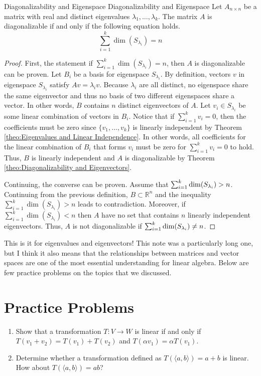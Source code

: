 \documentclass[../main.tex]{subfiles}
\begin{document}
\begin{theorem}{Diagonalizability and Eigenspace}
{Diagonalizability and Eigenspace}
Let $A_{n \times n}$ be a matrix with real and distinct eigenvalues
$\lambda_1, \ldots, \lambda_k$. The matrix $A$ is diagonalizable if
and only if the following equation holds.
\[
\sum_{i=1}^k \dim(S_{\lambda_i}) = n
\]
\end{theorem}
\begin{proof}
First, the statement if $\sum_{i=1}^k \dim(S_{\lambda_i}) = n$,
then $A$ is diagonalizable can be proven. Let $B_i$ be a basis
for eigenspace $S_{\lambda_i}$. By definition, vectors $v$ in
eigenspace $S_{\lambda_i}$ satisfy $Av = \lambda_i v$. Because
$\lambda_i$ are all distinct, no eigenspace share the same
eigenvector and thus no basis of two different eigenspaces
share a vector. In other words, $B$ contains $n$ distinct eigenvectors
of $A$. Let $v_i \in S_{\lambda_i}$ be some linear combination of
vectors in $B_i$. Notice that if $\sum_{i=1}^k v_i = 0$, then the
coefficients must be zero since $\{ v_1, \ldots, v_k \}$ is linearly
independent by Theorem \ref{theo:Eigenvalues and Linear Independence}.
In other words, all coefficients for the linear combination of $B_i$
that forms $v_i$ must be zero for $\sum_{i=1}^k v_i = 0$ to hold.
Thus, $B$ is linearly independent and $A$ is diagonalizable by
Theorem \ref{theo:Diagonalizability and Eigenvectors}.

Continuing, the converse can be proven. Assume that $\sum_{i=1}^k
\dim(S_{\lambda_i}) \linebreak > n$. Continuing from the previous
definition, $B \subset \mathbb{R}^n$ and the inequality $\sum_{i=1}^k
\dim(S_{\lambda_i}) > n$ leads to contradiction. Moreover, if
$\sum_{i=1}^k \dim(S_{\lambda_i}) < n$ then $A$ have no set that
contains $n$ linearly independent eigenvectors. Thus, $A$ is not
diagonalizable if $\sum_{i=1}^k \dim(S_{\lambda_i}) \linebreak
\neq n$.
\end{proof}

This is it for eigenvalues and eigenvectors! This note was a
particularly long one, but I think it also means that the
relationships between matrices and vector spaces are one of the
most essential understanding for linear algebra. Below are few
practice problems on the topics that we discussed.

\section{Practice Problems}
\begin{enumerate}
\item
Show that a transformation $T: V \to W$ is linear if and only if
$T(v_1 + v_2) = T(v_1) + T(v_2)$ and $T(\alpha v_1) = \alpha T(v_1)$.

\item
Determine whether a transformation defined as $T(\langle a, b \rangle)
= a + b$ is linear. How about $T(\langle a, b \rangle) = ab$?
\end{enumerate}
\end{document}

